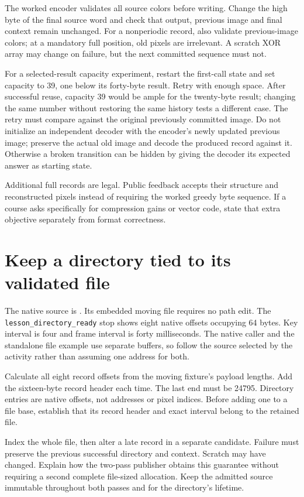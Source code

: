 The worked encoder validates all source colors before writing. Change the high
byte of the final source word and check that output, previous image and final
context remain unchanged. For a nonperiodic record, also validate previous-image
colors; at a mandatory full position, old pixels are irrelevant. A scratch XOR
array may change on failure, but the next committed sequence must not.

For a selected-result capacity experiment, restart the first-call state and
set capacity to 39, one below its forty-byte result. Retry with enough space.
After successful reuse, capacity 39 would be ample for the twenty-byte result;
changing the same number without restoring the same history tests a different
case.
The retry must compare against the original previously committed image. Do not
initialize an independent decoder with the encoder's newly updated previous
image; preserve the actual old image and decode the produced record against it.
Otherwise a broken transition can be hidden by giving the decoder its expected
answer as starting state.

Additional full records are legal. Public feedback accepts their structure and
reconstructed pixels instead of requiring the worked greedy byte sequence.
If a course asks specifically for compression gains or vector code, state that
extra objective separately from format correctness.

\section{Keep a directory tied to its validated file}

The native source is . Its embedded
moving file requires no path edit.
The \texttt{lesson\_directory\_ready} stop shows eight native offsets
occupying 64 bytes. Key interval is four and frame interval is forty milliseconds. The
native caller and the standalone file example use separate buffers, so follow
the source selected by the activity rather than assuming one address for both.

Calculate all eight record offsets from the moving fixture's payload lengths.
Add the sixteen-byte record header each time. The last end must be 24795.
Directory entries are native offsets, not addresses or pixel indices. Before
adding one to a file base, establish that its record header and exact interval
belong to the retained file.

Index the whole file, then alter a late record in a separate candidate. Failure
must preserve the previous successful directory and context. Scratch may have
changed. Explain how the two-pass publisher obtains this guarantee without
requiring a second complete file-sized allocation. Keep the admitted source
immutable throughout both passes and for the directory's lifetime.

